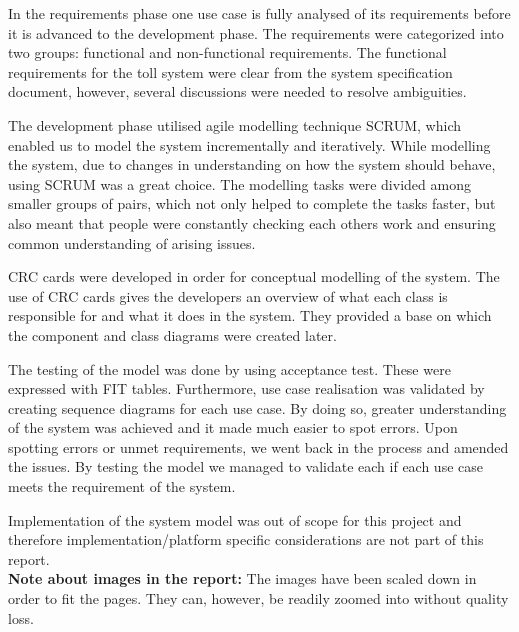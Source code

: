 In the requirements phase one use case is fully analysed of its requirements before it is advanced to the development phase. The requirements were categorized into two groups: functional and non-functional requirements. The functional requirements for the toll system were clear from the system specification document, however, several discussions were needed to resolve ambiguities.

The development phase utilised agile modelling technique SCRUM, which enabled us to model the system incrementally and iteratively. While modelling the system, due to changes in understanding on how the system should behave, using SCRUM was a great choice.  The modelling tasks were divided among smaller groups of pairs, which not only helped to complete the tasks faster, but also meant that people were constantly checking each others work and ensuring common understanding of arising issues.

CRC cards were developed in order for conceptual modelling of the system. The use of CRC cards gives the developers an overview of what each class is responsible for and what it does in the system. They provided a base on which the component and class diagrams were created later.

The testing of the model was done by using acceptance test. These were expressed with FIT tables. Furthermore, use case realisation was validated by creating sequence diagrams for each use case. By doing so, greater understanding of the system was achieved and it made much easier to spot errors. Upon spotting errors or unmet requirements, we went back in the process and amended the issues. By testing the model we managed to validate each if each use case meets the requirement of the system.

Implementation of the system model was out of scope for this project and therefore implementation/platform specific considerations are not part of this report.
\\

\textbf{Note about images in the report:} The images have been scaled down in order to fit the pages. They can, however, be readily zoomed into without quality loss.